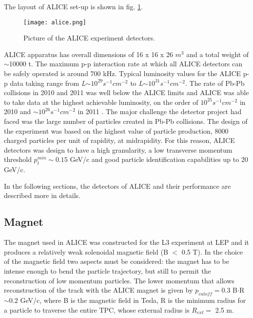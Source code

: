 The layout of ALICE set-up is shown in fig. \ref{fig:imageALICE}. 
\begin{figure}[!t]
\centering
\texttt{[image: alice.png]}
\caption{Picture of the ALICE experiment detectors.}
\label{fig:imageALICE}
\end{figure}
ALICE apparatus has overall dimensions of 16 x 16 x 26 $m^3$ and a total weight of $\sim$10000 t. The maximum p-p interaction rate at which all ALICE detectors can be safely operated is around 700 kHz. Typical luminosity values for the ALICE p-p data taking range from \textit{L}$\sim 10^{29}s^{-1}cm^{-2}$ to \textit{L}$\sim 10^{31}s^{-1}cm^{-2}$.
The rate of Pb-Pb collisions in 2010 and 2011 was well below the ALICE limits and ALICE was able to take data at the highest achievable luminosity, on the order of $10^{25}s^{-1}cm^{-2}$ in 2010 and $\sim 10^{26}s^{-1}cm^{-2}$ in 2011  \cite{ALICEperf-May2014}.
The major challenge the detector project had faced was the large number of particles created in Pb-Pb collisions. The design of the experiment was based on the highest value of particle production, 8000 charged particles per unit of rapidity, at midrapidity. For this reason, ALICE detectors was design to have a high granularity, a low transverse momentum threshold $p^{min}_t \sim 0.15 $ GeV/c and good particle identification capabilities up to 20 GeV/c.

In the following sections, the detectors of ALICE and their performance are described more in details.

\subsection{Magnet}
The magnet used in ALICE was constructed for the L3 experiment at LEP and it produces a relatively weak solenoidal magnetic field (B $<$ 0.5 T). In the choice of the magnetic field two aspects must be considered: the magnet has to be intense enough to bend the particle trajectory, but still to permit the reconstruction of low momentum particles. The lower momentum that allows reconstruction of the track with the ALICE magnet is given by $p_{cutoff}=0.3$ B$\cdot$R$\sim 0.2$ GeV/c, where B is the magnetic field in Tesla, R is the minimum radius for a particle to traverse the entire TPC, whose external radius is $R_{ext}=$ 2.5 m.


